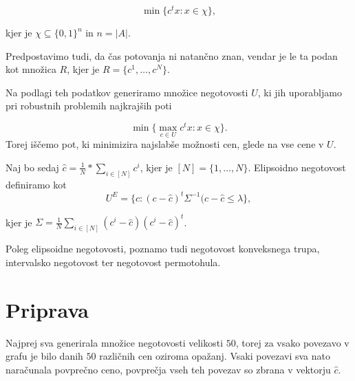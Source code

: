 \documentclass[a4paper, 12 pt]{article}
\theoremstyle{definition} %
\theoremstyle{plain} %
\theoremstyle{definition}
\begin{document}
\begin{equation*}
\min \{c^t x : x \in \chi \},
\end{equation*}

kjer je $\chi \subseteq \{0,1\}^n$ in $n = |A|$.

Predpostavimo tudi, da čas potovanja ni natančno znan, vendar je le ta podan kot množica $R$, kjer je $R = \{c^1, \dots, c^N \}$.

Na podlagi teh podatkov generiramo množice negotovosti $U$, ki jih uporabljamo pri robustnih problemih najkrajših poti

\begin{equation*}
\min \{\max \limits_{c \in U} c^t x : x \in \chi \}.
\end{equation*}
 Torej iščemo pot, ki minimizira najslabše možnosti cen, glede na vse cene v $U$.

\bigskip

Naj bo sedaj $\hat{c} = \frac{1}{N} * \sum_{i \in [N]} c^i $, kjer je $[N] = \{1, \dots , N \}$. Elipsoidno negotovost definiramo kot
\begin{equation*}
U^E = \{c: (c - \hat{c})^t \Sigma ^{-1} (c - \hat{c}	\le \lambda \},
\end{equation*}

kjer je $\Sigma = \frac{1}{N} \sum_{i \in [N]} (c^i -\hat{c}) (c^i -\hat{c})^t$.

\bigskip
Poleg elipsoidne negotovosti, poznamo tudi negotovost konveksnega trupa, intervalsko negotovost ter negotovost permotohula. 
\pagebreak


\section{Priprava}

Najprej sva generirala množice negotovosti velikosti $50$, torej za vsako povezavo v grafu je bilo danih $50$ različnih cen oziroma opažanj. Vsaki povezavi sva nato naračunala povprečno ceno, povprečja vseh teh povezav so zbrana v vektorju $\hat{c}$.\newline
\end{document}
